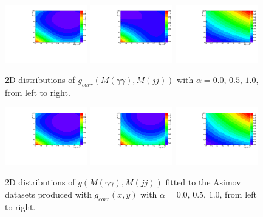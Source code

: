 \begin{figure}[h]
  \centering
\includegraphics[width=0.32\textwidth]{figures/sec-background/correlation/res_th2F_exp_th2f_res_alpha_00_n005.pdf}
\includegraphics[width=0.32\textwidth]{figures/sec-background/correlation/res_th2F_exp_th2f_res_alpha_05_n005.pdf}
\includegraphics[width=0.32\textwidth]{figures/sec-background/correlation/res_th2F_exp_th2f_res_alpha_10_n005.pdf}
  \caption{2D distributions of $g_{corr}(M(\gamma\gamma),M(jj))$ with $\alpha = 0.0,\,0.5,\,1.0$, from left to right. }
  \label{fig:gcorr_alpha}
\end{figure}

\begin{figure}[h]
  \centering
\includegraphics[width=0.32\textwidth]{figures/sec-background/correlation/res_th2F_obs_th2f_res_alpha_00_n005.pdf}
\includegraphics[width=0.32\textwidth]{figures/sec-background/correlation/res_th2F_obs_th2f_res_alpha_05_n005.pdf}
\includegraphics[width=0.32\textwidth]{figures/sec-background/correlation/res_th2F_obs_th2f_res_alpha_10_n005.pdf}
  \caption{2D distributions of $g(M(\gamma\gamma),M(jj))$ fitted to the Asimov datasets produced with  $g_{corr}(x,y)$ with $\alpha = 0.0,\,0.5,\,1.0$, from left to right.}
  \label{fig:g_alpha}
\end{figure}

